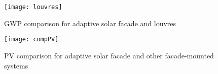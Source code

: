 
\begin{figure}[H]
\texttt{[image: louvres]}
\caption{GWP comparison for adaptive solar facade and louvres}
\label{louvres}
\end{figure}

\begin{figure}[H]
\texttt{[image: compPV]}
\caption{PV comparison for adaptive solar facade and other facade-mounted systems}
\label{compPV}
\end{figure}